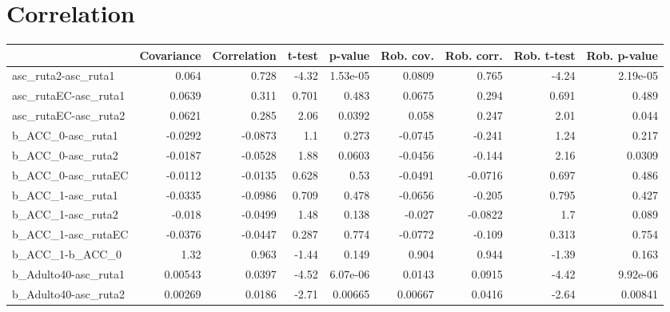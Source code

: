 \section{Correlation}
\begin{tabular}{lrrrrrrrr}
\toprule
{} &  Covariance &  Correlation &    t-test &  p-value &  Rob. cov. &  Rob. corr. &  Rob. t-test &  Rob. p-value \\
\midrule
asc\_ruta2-asc\_ruta1        &       0.064 &        0.728 &     -4.32 & 1.53e-05 &     0.0809 &       0.765 &        -4.24 &      2.19e-05 \\
asc\_rutaEC-asc\_ruta1       &      0.0639 &        0.311 &     0.701 &    0.483 &     0.0675 &       0.294 &        0.691 &         0.489 \\
asc\_rutaEC-asc\_ruta2       &      0.0621 &        0.285 &      2.06 &   0.0392 &      0.058 &       0.247 &         2.01 &         0.044 \\
b\_ACC\_0-asc\_ruta1          &     -0.0292 &      -0.0873 &       1.1 &    0.273 &    -0.0745 &      -0.241 &         1.24 &         0.217 \\
b\_ACC\_0-asc\_ruta2          &     -0.0187 &      -0.0528 &      1.88 &   0.0603 &    -0.0456 &      -0.144 &         2.16 &        0.0309 \\
b\_ACC\_0-asc\_rutaEC         &     -0.0112 &      -0.0135 &     0.628 &     0.53 &    -0.0491 &     -0.0716 &        0.697 &         0.486 \\
b\_ACC\_1-asc\_ruta1          &     -0.0335 &      -0.0986 &     0.709 &    0.478 &    -0.0656 &      -0.205 &        0.795 &         0.427 \\
b\_ACC\_1-asc\_ruta2          &      -0.018 &      -0.0499 &      1.48 &    0.138 &     -0.027 &     -0.0822 &          1.7 &         0.089 \\
b\_ACC\_1-asc\_rutaEC         &     -0.0376 &      -0.0447 &     0.287 &    0.774 &    -0.0772 &      -0.109 &        0.313 &         0.754 \\
b\_ACC\_1-b\_ACC\_0            &        1.32 &        0.963 &     -1.44 &    0.149 &      0.904 &       0.944 &        -1.39 &         0.163 \\
b\_Adulto40-asc\_ruta1       &     0.00543 &       0.0397 &     -4.52 & 6.07e-06 &     0.0143 &      0.0915 &        -4.42 &      9.92e-06 \\
b\_Adulto40-asc\_ruta2       &     0.00269 &       0.0186 &     -2.71 &  0.00665 &    0.00667 &      0.0416 &        -2.64 &       0.00841 \\

\end{tabular}
